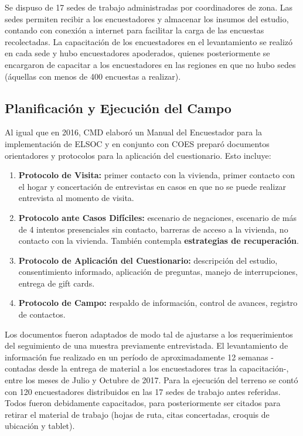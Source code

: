 \documentclass[12pt]{report}
\begin{document}
Se dispuso de 17 sedes de trabajo administradas por coordinadores de zona. Las sedes permiten recibir a los encuestadores y almacenar los insumos del estudio, contando con conexión a internet para facilitar la carga de las encuestas recolectadas. La capacitación de los encuestadores en el levantamiento se realizó en cada sede y hubo encuestadores apoderados, quienes posteriormente se encargaron de capacitar a los encuestadores en las regiones en que no hubo sedes (áquellas con menos de 400 encuestas a realizar).\\ 

\subsection*{Planificación y Ejecución del Campo}

Al igual que en 2016, CMD elaboró un Manual del Encuestador para la implementación de ELSOC y en conjunto con COES preparó documentos orientadores y protocolos para la aplicación del cuestionario. Esto incluye:
\begin{enumerate}[noitemsep]
	\item \textbf{Protocolo de Visita:} primer contacto con la vivienda, primer contacto con el hogar y concertación de entrevistas en casos en que no se puede realizar entrevista al momento de visita. 
	\item \textbf{Protocolo ante Casos Difíciles:} escenario de negaciones, escenario de más de 4 intentos presenciales sin contacto, barreras de acceso a la vivienda, no contacto con la vivienda. También contempla \textbf{ estrategias de recuperación}.
	\item \textbf{Protocolo de Aplicación del Cuestionario:} descripción del estudio, consentimiento informado, aplicación de preguntas, manejo de interrupciones, entrega de gift cards.
	\item \textbf{Protocolo de Campo:} respaldo de información, control de avances, registro de contactos.
\end{enumerate}

Los documentos fueron adaptados de modo tal de ajustarse a los requerimientos del seguimiento de una muestra previamente entrevistada. El levantamiento de información fue realizado en un período de aproximadamente 12 semanas -contadas desde la entrega de material a los encuestadores tras la capacitación-, entre los meses de Julio y Octubre de 2017. Para la ejecución del terreno se contó con 120 encuestadores distribuidos en las 17 sedes de trabajo antes referidas. Todos fueron debidamente capacitados, para posteriormente ser citados para retirar el material de trabajo (hojas de ruta, citas concertadas, croquis de ubicación y tablet).\\
\end{document}
